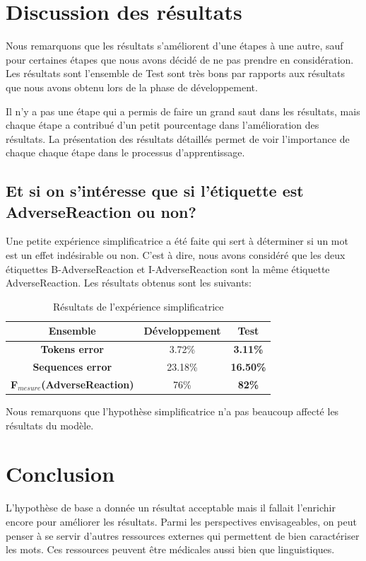 \documentclass[a4paper,english,11pt]{article}
\begin{document}
\section{Discussion des résultats}
Nous remarquons que les résultats s'améliorent d'une étapes à une autre, sauf pour certaines étapes que nous avons décidé de ne pas prendre en considération. Les résultats sont l'ensemble de Test sont très bons par rapports aux résultats que nous avons obtenu lors de la phase de développement.

Il n'y a pas une étape qui a permis de faire un grand saut dans les résultats, mais chaque étape a contribué d'un petit pourcentage dans l'amélioration des résultats. La présentation des résultats détaillés permet de voir l'importance de chaque chaque étape dans le processus d'apprentissage.

\subsection{Et si on s'intéresse que si l'étiquette est AdverseReaction ou non?}
Une petite expérience simplificatrice a été faite qui sert à déterminer si un mot est un effet indésirable ou non. C'est à dire, nous avons considéré que les deux étiquettes B-AdverseReaction et I-AdverseReaction sont la même étiquette AdverseReaction. Les résultats obtenus sont les suivants:


\begin{table}[H]\centering
	\begin{tabular}{ccc}
		\toprule \textbf{Ensemble} & Développement & \textbf{Test}\\    \midrule
		\textbf{Tokens error} & 3.72\% & \textbf{3.11\%}  \\
		\textbf{Sequences error} & 23.18\% & \textbf{16.50\%} \\
		\textbf{F$_{mesure}$(AdverseReaction)} & 76\% & \textbf{82\%}\\
		\bottomrule	
	\end{tabular}
	\caption{Résultats de l'expérience simplificatrice}
\end{table}

Nous remarquons que l'hypothèse simplificatrice n'a pas beaucoup affecté les résultats du modèle.
\section{Conclusion}
L'hypothèse de base a donnée un résultat acceptable mais il fallait l'enrichir encore pour améliorer les résultats. Parmi les perspectives envisageables, on peut penser à se servir d'autres ressources externes qui permettent de bien caractériser les mots. Ces ressources peuvent être médicales aussi bien que linguistiques.
\end{document}

